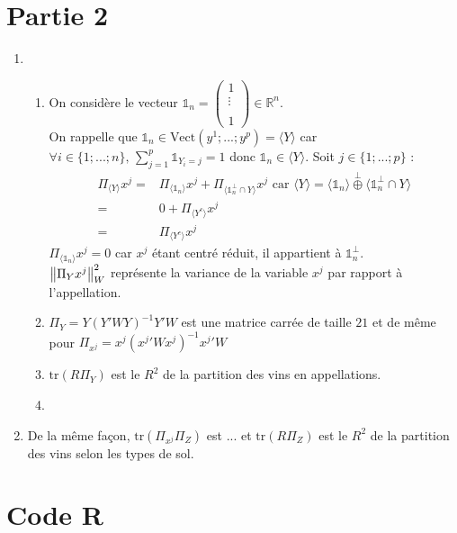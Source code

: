 \documentclass{article}
\begin{document}
\section{Partie 2}

\begin{enumerate}
\item 
	\begin{enumerate}
	\item On considère le vecteur $\mathds{1}_n=\begin{pmatrix}
	1 \\ 
	\vdots \\ 
	 \\ 
	1
	\end{pmatrix} \in\mathbb{R}^{n}$.\\
	 On rappelle que $\mathds{1}_n\in \text{Vect}\left(y^1;...;y^p\right)=\langle Y \rangle$ car $\forall i\in\{1;...;n\},\, \sum_{j=1}^p \mathds{1}_{Y_i=j}=1$ donc $\mathds{1}_n\in \langle Y \rangle$.
Soit $j\in\{1;...;p\}$ :
	\begin{align*}
	\Pi_{\langle Y \rangle} x^j =& \Pi_{\langle\mathds{1}_n\rangle}x^j +\Pi_{\langle \mathds{1}_n^{\perp} \cap Y \rangle} x^j  \text{ car } \langle Y \rangle = \langle \mathds{1}_n \rangle \overset{\perp}{\oplus}\langle \mathds{1}_n^{\perp} \cap Y \rangle \\
	  =& 0 + \Pi_{\langle Y^c \rangle} x^j \\
	  =& \Pi_{\langle Y^c \rangle} x^j
	\end{align*}
 $\Pi_{\langle\mathds{1}_n\rangle}x^j=0$ car $x^j$ étant centré réduit, il appartient à $\mathds{1}_n^{\perp}$.\\
 
	
	$\left\| \Pi_Yx^j\right\|^2_{W}$ représente la variance de la variable $x^j$ par rapport à l'appellation.
	\item $\Pi_Y=Y\left(Y'WY\right)^{-1}Y'W$ est une matrice carrée de taille $21$ et de même pour $\Pi_{x^j}=x^{j}\left({x^{j}}'Wx^{j}\right)^{-1}{x^{j}}'W$
	
	\item $\text{tr}(R \Pi_Y)$ est le $R^2$ de la partition des vins en appellations.
	
	\item 
	\end{enumerate}

\item De la même façon, $\text{tr}(\Pi_{x^j}\Pi_{Z})$ est ... et $\text{tr}(R\Pi_{Z})$ est le $R^2$ de la partition des vins selon les types de sol.
\end{enumerate}

\newpage

\appendix 
\section{Code R}
\end{document}
